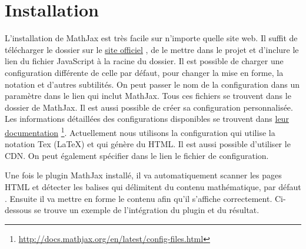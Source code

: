 \documentclass[letterpaper,10pt,oneside]{sphinxmanual}
\begin{document}
\section{Installation}
\label{maths:installation}
L'installation de MathJax est très facile sur n'importe quelle site web. Il suffit de télécharger le dossier sur le \href{http://mathjax.org}{site officiel} \footnotemark[1], de le mettre dans le projet et d'inclure le lien du fichier JavaScript  à la racine du dossier. Il est possible de charger une configuration différente de celle par défaut, pour changer la mise en forme, la notation et d'autres subtilités. On peut passer le nom de la configuration dans un paramètre  dans le lien qui inclut MathJax. Tous ces fichiers se trouvent dans le dossier  de MathJax. Il est aussi possible de créer sa configuration personnalisée. Les informations détaillées des configurations disponibles se trouvent dans \href{http://docs.mathjax.org/en/latest/config-files.html}{leur documentation} \footnote{
\href{http://docs.mathjax.org/en/latest/config-files.html}{http://docs.mathjax.org/en/latest/config-files.html}
}. Actuellement nous utilisons la configuration  qui utilise la notation Tex (LaTeX) et qui génère du HTML. Il est aussi possible d'utiliser le CDN. On peut également spécifier dans le lien le fichier de configuration.

Une fois le plugin MathJax installé, il va automatiquement scanner les pages HTML et détecter les balises qui délimitent du contenu mathématique, par défaut \code{\$\$}. Ensuite il va mettre en forme le contenu afin qu'il s'affiche correctement. Ci-dessous se trouve un exemple de l'intégration du plugin et du résultat.
\end{document}
